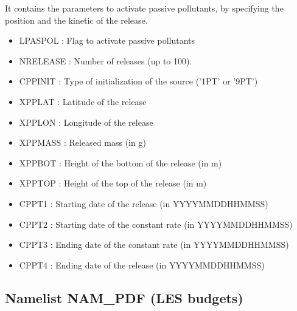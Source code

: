 It contains the parameters to activate passive pollutants, by specifying the position and the kinetic of the release. 
\begin{itemize}
\item LPASPOL  :
Flag to activate passive pollutants                                            
\item NRELEASE :
Number of releases (up to 100).                                                                                                    
\item CPPINIT :
Type of initialization of the source ('1PT' or '9PT')          
\item XPPLAT :
Latitude of the release                      
\item XPPLON :
Longitude of the release                      
\item XPPMASS :
Released mass (in g)                         
\item XPPBOT :
Height of the bottom of the release (in m)          
\item XPPTOP :
Height of the top of the release (in m)        
\item CPPT1 :
Starting date of the release (in YYYYMMDDHHMMSS)        
\item CPPT2 :
Starting date of the constant rate (in YYYYMMDDHHMMSS)        
\item CPPT3 :
Ending date of the constant rate (in YYYYMMDDHHMMSS)        
\item CPPT4 :
Ending date of the release (in YYYYMMDDHHMMSS)        
\end{itemize}
\subsection{Namelist NAM\_PDF (LES budgets) }                                

